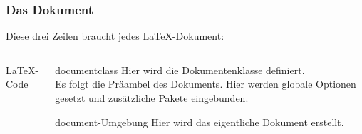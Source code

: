 \begin{frame}[fragile]
    \frametitle{Das Dokument}
    Diese drei Zeilen braucht jedes \LaTeX-Dokument:
    \begin{columns}[T]
        \begin{column}{0.4\textwidth}
            \begin{block}{\LaTeX-Code}
            \end{block}
        \end{column}
        \begin{column}{0.55\textwidth}
            \begin{block}{documentclass}
                Hier wird die Dokumentenklasse definiert. \\
                Es folgt die \alert{Präambel} des Dokuments. 
                Hier werden globale Optionen gesetzt und zusätzliche Pakete eingebunden.\\
            \end{block}

            \vspace{0.55cm}

            \begin{block}{document-Umgebung}
                Hier wird das eigentliche Dokument erstellt.
            \end{block}
        \end{column}
    \end{columns}
\end{frame}

